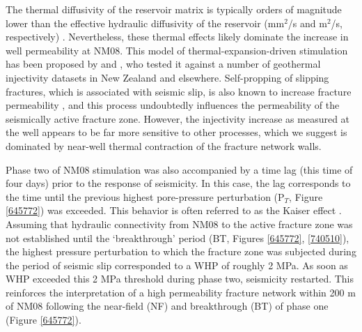 The thermal \gls{diffusivity} of the reservoir matrix is typically orders of magnitude lower than the effective hydraulic \gls{diffusivity} of the reservoir (mm$^2$/s and m$^2$/s, respectively) \citep{Kanamori_1968,Shapiro_2002}. Nevertheless, these thermal effects likely dominate the increase in well \gls{permeability} at NM08. This model of thermal-expansion-driven \gls{stimulation} has been proposed by \citet{grant2013thermal} and \citet{siega_2014}, who tested it against a number of geothermal \gls{injectivity} datasets in New Zealand and elsewhere. Self-propping of slipping fractures, which is associated with seismic slip, is also known to increase fracture \gls{permeability} \citep[e.g.][]{Lee_2002}, and this process undoubtedly influences the \gls{permeability} of the seismically active fracture zone. However, the \gls{injectivity} increase as measured at the well appears to be far more sensitive to other processes, which we suggest is dominated by near-well thermal contraction of the fracture network walls.

Phase two of NM08 stimulation was also accompanied by a time lag (this time of four days) prior to the response of seismicity. In this case, the lag corresponds to the time until the previous highest pore-pressure perturbation (P$_T$, Figure \ref{645772}) was exceeded. This behavior is often referred to as the Kaiser effect \citep{Holcomb_1993}. Assuming that hydraulic connectivity from NM08 to the active fracture zone was not established until the `breakthrough' period (BT, Figures \ref{645772}, \ref{740510}), the highest pressure perturbation to which the fracture zone was subjected during the period of seismic slip corresponded to a \acrshort{WHP} of roughly 2 MPa. As soon as \acrshort{WHP} exceeded this 2 MPa threshold during phase two, seismicity restarted. This reinforces the interpretation of a high \gls{permeability} fracture network within 200 m of NM08 following the near-field (NF) and breakthrough (BT) of phase one (Figure \ref{645772}).

